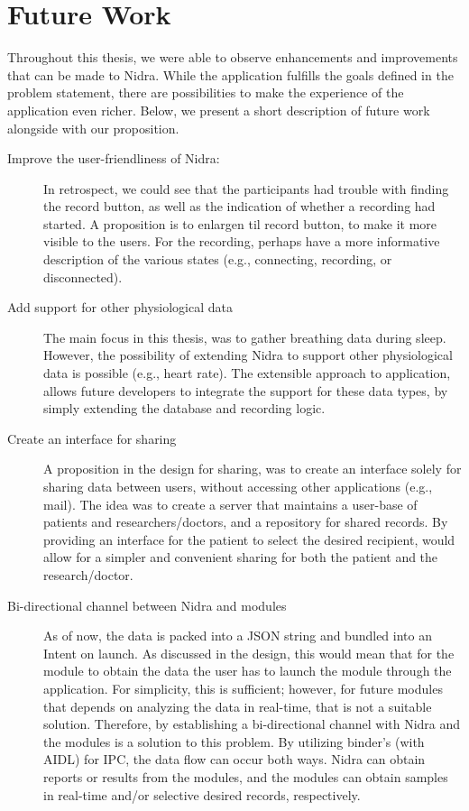 \section{Future Work}
Throughout this thesis, we were able to observe enhancements and improvements that can be made to Nidra. While the application fulfills the goals defined in the problem statement, there are possibilities to make the experience of the application even richer. Below, we present a short description of future work alongside with our proposition. 


\begin{description}
    \item[Improve the user-friendliness of Nidra:] In retrospect, we could see that the participants had trouble with finding the record button, as well as the indication of whether a recording had started. A proposition is to enlargen til record button, to make it more visible to the users. For the recording, perhaps have a more informative description of the various states (e.g., connecting, recording, or disconnected). 
    \item[Add support for other physiological data] The main focus in this thesis, was to gather breathing data during sleep. However, the possibility of extending Nidra to support other physiological data is possible (e.g., heart rate). The extensible approach to application, allows future developers to integrate the support for these data types, by simply extending the database and recording logic. 
    \item[Create an interface for sharing] A proposition in the design for sharing, was to create an interface solely for sharing data between users, without accessing other applications (e.g., mail). The idea was to create a server that maintains a user-base of patients and researchers/doctors, and a repository for shared records. By providing an interface for the patient to select the desired recipient, would allow for a simpler and convenient sharing for both the patient and the research/doctor. 
    \item[Bi-directional channel between Nidra and modules] As of now, the data is packed into a JSON string and bundled into an Intent on launch. As discussed in the design, this would mean that for the module to obtain the data the user has to launch the module through the application. For simplicity, this is sufficient; however, for future modules that depends on analyzing the data in real-time, that is not a suitable solution. Therefore, by establishing a bi-directional channel with Nidra and the modules is a solution to this problem. By utilizing binder's (with AIDL) for IPC, the data flow can occur both ways. Nidra can obtain reports or results from the modules, and the modules can obtain samples in real-time and/or selective desired records, respectively. 

\end{description}

